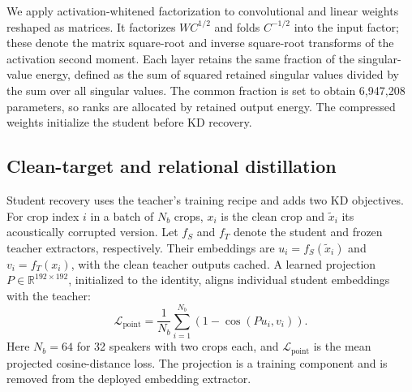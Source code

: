 \documentclass[11pt]{article}
\begin{document}
We apply activation-whitened factorization to convolutional and linear weights reshaped as matrices. It factorizes $WC^{1/2}$ and folds $C^{-1/2}$ into the input factor; these denote the matrix square-root and inverse square-root transforms of the activation second moment. Each layer retains the same fraction of the singular-value energy, defined as the sum of squared retained singular values divided by the sum over all singular values. The common fraction is set to obtain 6,947,208 parameters, so ranks are allocated by retained output energy. The compressed weights initialize the student before KD recovery.

\subsection{Clean-target and relational distillation}
Student recovery uses the teacher's training recipe and adds two KD objectives. For crop index $i$ in a batch of $N_b$ crops, $x_i$ is the clean crop and $\tilde x_i$ its acoustically corrupted version. Let $f_S$ and $f_T$ denote the student and frozen teacher extractors, respectively. Their embeddings are $u_i=f_S(\tilde x_i)$ and $v_i=f_T(x_i)$, with the clean teacher outputs cached. A learned projection $P\in\mathbb R^{192\times192}$, initialized to the identity, aligns individual student embeddings with the teacher:
\begin{equation}
 \mathcal L_{\mathrm{point}}=\frac{1}{N_b}\sum_{i=1}^{N_b}
 \left(1-\cos(Pu_i,v_i)\right).
\end{equation}
Here $N_b=64$ for 32 speakers with two crops each, and $\mathcal L_{\mathrm{point}}$ is the mean projected cosine-distance loss. The projection is a training component and is removed from the deployed embedding extractor.
\end{document}
